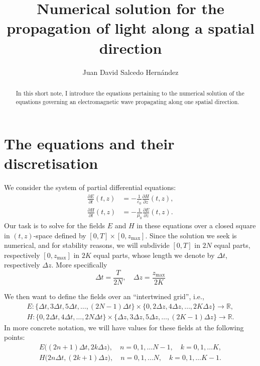 \documentclass[
    fontsize=9pt,
    DIV = calc,
    ]{scrarticle}
\title{Numerical solution for the propagation of light along a spatial direction}
\author{Juan David Salcedo Hernández}
\begin{document}

\begin{abstract}
  In this short note, I introduce the equations pertaining to the numerical
  solution of the equations governing an electromagnetic wave propagating along
  one spatial direction.
\end{abstract}

\section{The equations and their discretisation}
We consider the system of partial differential equations:
\begin{align*}
\frac{\partial E}{\partial t}(t, z) &= -\frac{1}{\varepsilon_0} \frac{\partial H}{\partial z}(t, z),\\
\frac{\partial H}{\partial t}(t, z) &= -\frac{1}{\mu_0} \frac{\partial E}{\partial z}(t, z).
\end{align*}
Our task is to solve for the fields \(E\) and \(H\) in these equations over a
closed square in \((t, z)\)-space defined by \([0,T]\times [0,
z_{\text{max}}]\). Since the solution we seek is numerical, and for stability reasons,
we will subdivide \([0,T]\) in \(2N\) equal parts, respectively \([0,
  z_{\text{max}}]\) in \(2K\) equal parts, whose length we denote by \(\Delta
t\), respectively \(\Delta z\). More specifically
\[
\Delta t = \frac{T}{2N},\quad \Delta z = \frac{z_{\text{max}}}{2K}
\]


We then want to define the fields over an ``intertwined grid'', i.e.,
\begin{align*}
E : \{\Delta t, 3 \Delta t, 5 \Delta t, \ldots, (2N - 1)\Delta t\} \times \{0,
2\Delta z, 4\Delta z, \ldots, 2K \Delta z\} \longrightarrow \mathbb{R},\\
H : \{0, 2\Delta t, 4 \Delta t, \ldots, 2N\Delta t\} \times \{\Delta z, 3 \Delta
z, 5 \Delta z, \ldots, (2K - 1)\Delta z\} \longrightarrow \mathbb{R}.
\end{align*}
In more concrete notation, we will have values for these fields at the following
points:
\begin{align*}
E\big( (2n + 1) \Delta t, 2k \Delta z \big), \quad n = 0, 1, \ldots N-1,\quad k = 0, 1, \ldots K,\\
H\big( 2n \Delta t, (2k + 1) \Delta z \big), \quad n = 0, 1, \ldots N,\quad k = 0, 1, \ldots K-1.
\end{align*}
\end{document}
